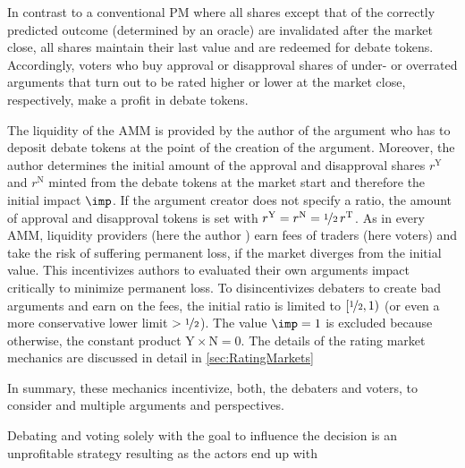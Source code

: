\documentclass[%
aip,
amsmath,amssymb,
reprint,%
unsortedaddress,
nofootinbib
]{revtex4-2}
\newcommand{\T}{\text{T}}\newcommand{\debateTokens}{debate tokens}
\newcommand{\Y}{\text{Y}}
\newcommand{\N}{\text{N}}
\begin{document}
In contrast to a conventional \ac{PM} where all shares except that of the correctly predicted outcome (determined by an oracle) are invalidated after the market close,
all shares maintain their last value and are redeemed for \debateTokens. 
	Accordingly, voters who buy approval or disapproval shares of under- or overrated arguments that turn out to be rated higher or lower at the market close, respectively, make a profit in \debateTokens.

The liquidity of the \ac{AMM} is provided by the author of the argument who has to deposit \debateTokens{} at the point of the creation of the argument.
Moreover, the author determines the initial amount of the approval and disapproval shares $r^\Y$ and $r^\N$ minted from the \debateTokens{} at the market start
and therefore the initial impact $\imp$.
If the argument creator does not specify a ratio, 
the amount of approval and disapproval tokens is set with $r^\Y=r^\N=\nicefrac{1}{2}\,r^\T$. 
As in every \ac{AMM}, liquidity providers (here the author )
earn fees of traders (here voters)
and 
take the risk of suffering permanent loss, if the market diverges from the initial value.
This incentivizes authors to evaluated their own arguments impact critically 
to minimize permanent loss. 
To disincentivizes debaters to create bad arguments and earn on the fees,
the initial ratio is limited to $[\nicefrac{1}{2},1)$ (or even a more conservative lower limit $>\nicefrac{1}{2}$).
The value $\imp=1$ is excluded because otherwise, the constant product $\Y\times \N = 0$.
The details of the rating market mechanics are discussed in detail in \cref{sec:RatingMarkets}

In summary, these mechanics incentivize, both, the debaters and voters, to consider and multiple arguments and perspectives.
 
Debating and voting solely with the goal to influence the decision is an unprofitable  strategy resulting
as the actors end up with 
\end{document}
